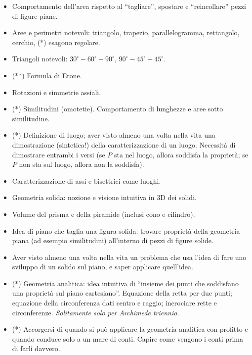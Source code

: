 \documentclass[a4paper,10pt]{paper}
\renewcommand{\star}{(*)}
\newcommand{\sstar}{(**)}
\begin{document}
\begin{itemize}
 \item Comportamento dell'area rispetto al ``tagliare'', spostare e ``reincollare'' pezzi di figure piane.
 \item Aree e perimetri notevoli: triangolo, trapezio, parallelogramma, rettangolo, cerchio, \star{} esagono regolare.
 \item Triangoli notevoli: $30^\circ-60^\circ-90^\circ$, $90^\circ-45^\circ-45^\circ$.
 \item \sstar{} Formula di Erone.
 \item Rotazioni e simmetrie assiali.
 \item \star{} Similitudini (omotetie). Comportamento di lunghezze e aree sotto similitudine.
 \item \star{} Definizione di luogo; aver visto almeno una volta nella vita una dimostrazione (sintetica!) della caratterizzazione di un luogo. Necessità di dimostrare entrambi i versi (se $P$ sta nel luogo, allora soddisfa la proprietà; se $P$ non sta sul luogo, allora non la soddisfa).
 \item Caratterizzazione di assi e bisettrici come luoghi.
 \item Geometria solida: nozione e visione intuitiva in 3D dei solidi.
 \item  Volume del prisma e della piramide (inclusi cono e cilindro).
 \item Idea di piano che taglia una figura solida: trovare proprietà della geometria piana (ad esempio similitudini) all'interno di pezzi di figure solide.
 \item Aver visto almeno una volta nella vita un problema che usa l'idea di fare uno sviluppo di un solido sul piano, e saper applicare quell'idea.
 \item \star{} Geometria analitica: idea intuitiva di ``insieme dei punti che soddisfano una proprietà sul piano cartesiano''. Equazione della retta per due punti; equazione della circonferenza dati centro e raggio; incrociare rette e circonferenze. \emph{Solitamente solo per Archimede triennio}.
 \item \star{} Accorgersi di quando si può applicare la geometria analitica con profitto e quando conduce solo a un mare di conti. Capire come vengono i conti prima di farli davvero.
\end{itemize}
\end{document}
